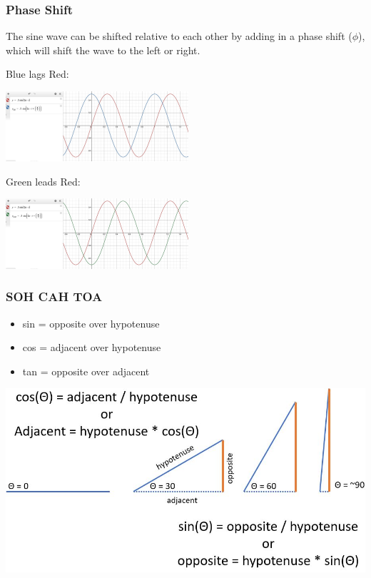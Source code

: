 \documentclass{beamer}
\begin{document}
\begin{frame}\frametitle{Phase Shift}
The sine wave can be shifted relative to each other by adding in a phase shift ($\phi$), which will shift the wave to the left or right.

Blue lags Red: 
\begin{center}
\includegraphics[height=2.6cm]{fig/sin_lag.jpg}
\end{center}

Green leads Red: 
\begin{center}
\includegraphics[height=2.6cm]{fig/sin_lead.jpg}
\end{center}

\end{frame}




\begin{frame}\frametitle{SOH CAH TOA}

\begin{itemize}
\item sin = opposite over hypotenuse
\item cos = adjacent over hypotenuse
\item tan = opposite over adjacent
\end{itemize}

\vspace{0.25cm}

\begin{center}
\includegraphics[scale=0.35]{fig/sohcahtoa.jpg}
\end{center}
\end{frame}
\end{document}
